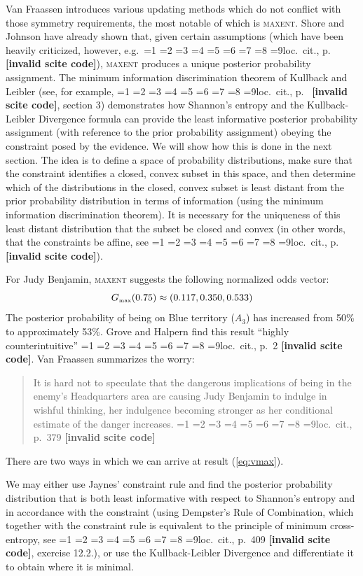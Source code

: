 \documentclass[12pt]{article}
\newcommand{\qeins}[1]{``#1''}
\newif\ifNumericalOrYear
\newcommand{\PageP}{p.~}
\newcommand{\PageP}{}
\newcommand{\nias}{\noindent} %
\newcommand{\scite}[3]{\ifnum#1=1\ifNumericalOrYear\citep{#2}\else\citeyearpar{#2}\fi\else
\ifnum#1=2\ifNumericalOrYear\citep[#3]{#2}\else\citep[{\PageP}#3]{#2}\fi\else
\ifnum#1=3\ifNumericalOrYear(\citet[#3]{#2})\else\citep[{\PageP}#3]{#2}\fi\else
\ifnum#1=4\ifNumericalOrYear\citet{#2}\else\citet{#2}\fi\else
\ifnum#1=5\ifNumericalOrYear(\citet{#2})\else\citep{#2}\fi\else
\ifnum#1=6\ifNumericalOrYear(\citet[#3]{#2})\else\citep[{\PageP}#3]{#2}\fi\else
\ifnum#1=7\ifNumericalOrYear\citep{#2}\else\citealp{#2}\fi\else
\ifnum#1=8\ifNumericalOrYear\citep[#3]{#2}\else\citealp[{\PageP}#3]{#2}\fi\else
\ifnum#1=9\ifNumericalOrYear\citep[#3]{#2}\else{}loc.\ cit., {\PageP}#3\fi\else
\textbf{[invalid scite code]}\fi\fi\fi\fi\fi\fi\fi\fi\fi}
\newenvironment{quotex}{\begin{quote}\begin{footnotesize}}{\end{footnotesize}\end{quote}}
\begin{document}
Van Fraassen introduces various updating methods which do not conflict
with those symmetry requirements, the most notable of which is
\textsc{maxent}. Shore and Johnson have already shown that, given
certain assumptions (which have been heavily criticized, however,
e.g.\ \scite{7}{uffink96}{}), \textsc{maxent} produces a unique
posterior probability assignment. The minimum information
discrimination theorem of Kullback and Leibler (see, for example,
\scite{7}{csiszar67}{}, section 3) demonstrates how Shannon's entropy
and the Kullback-Leibler Divergence formula can provide the least
informative posterior probability assignment (with reference to the
prior probability assignment) obeying the constraint posed by the
evidence. We will show how this is done in the next section. The idea
is to define a space of probability distributions, make sure that the
constraint identifies a closed, convex subset in this space, and then
determine which of the distributions in the closed, convex subset is
least distant from the prior probability distribution in terms of
information (using the minimum information discrimination theorem). It
is necessary for the uniqueness of this least distant distribution
that the subset be closed and convex (in other words, that the
constraints be affine, see \scite{7}{csiszar67}{}).

For Judy Benjamin, \textsc{maxent} suggests the following normalized
odds vector:
\begin{equation}
  \label{eq:vmax}
  G_{\mbox{{\tiny max}}}(0.75)\approx(0.117,0.350,0.533)
\end{equation}
The posterior probability of being on Blue territory ($A_{3}$) has
increased from 50\% to approximately 53\%. Grove and Halpern find this
result \qeins{highly counterintuitive} \scite{2}{grovehalpern97}{2}.
Van Fraassen summarizes the worry:
\begin{quotex}
  It is hard not to speculate that the dangerous implications of being
  in the enemy's Headquarters area are causing Judy Benjamin to
  indulge in wishful thinking, her indulgence becoming stronger as her
  conditional estimate of the danger increases. \scite{3}{fraassen81}{379}
\end{quotex}

\bigskip

\nias There are two ways in which we can arrive at result
({\ref{eq:vmax}}).

We may either use Jaynes' constraint rule and find the posterior
probability distribution that is both least informative with respect
to Shannon's entropy and in accordance with the constraint (using
Dempster's Rule of Combination, which together with the constraint
rule is equivalent to the principle of minimum cross-entropy, see
\scite{8}{coverthomas06}{409}, exercise 12.2.), or use the
Kullback-Leibler Divergence and differentiate it to obtain where it is
minimal.
\end{document}

